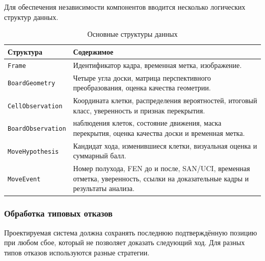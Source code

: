 Для обеспечения независимости компонентов вводится несколько логических структур данных.

\begin{table}[htbp]
\centering
\caption{Основные структуры данных}
\begin{tabular}{|>{\raggedright\arraybackslash}p{}|>{\raggedright\arraybackslash}p{}|}
\hline
\textbf{Структура} & \textbf{Содержимое} \\
\hline
\texttt{Frame} & Идентификатор кадра, временная метка, изображение. \\
\hline
\texttt{BoardGeometry} & Четыре угла доски, матрица перспективного преобразования, оценка качества геометрии. \\
\hline
\texttt{CellObservation} & Координата клетки, распределения вероятностей, итоговый класс, уверенность и признак перекрытия. \\
\hline
\texttt{BoardObservation} & 64 наблюдения клеток, состояние движения, маска перекрытия, оценка качества доски и временная метка. \\
\hline
\texttt{MoveHypothesis} & Кандидат хода, изменившиеся клетки, визуальная оценка и суммарный балл. \\
\hline
\texttt{MoveEvent} & Номер полухода, FEN до и после, SAN/UCI, временная отметка, уверенность, ссылки на доказательные кадры и результаты анализа. \\
\hline
\end{tabular}
\end{table}

\subsubsection{Обработка типовых отказов}

Проектируемая система должна сохранять последнюю подтверждённую позицию при любом сбое, который не позволяет доказать следующий ход. Для разных типов отказов используются разные стратегии.

